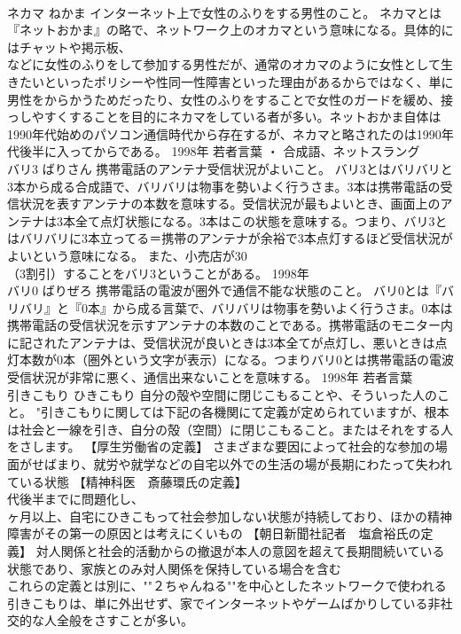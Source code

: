 \documentclass[8pt]{extreport}
\begin{document}
\begin{CJK}{UTF8}{min}
\\	ネカマ	ねかま	インターネット上で女性のふりをする男性のこと。	ネカマとは『ネットおかま』の略で、ネットワーク上のオカマという意味になる。具体的にはチャットや掲示板、
\\	などに女性のふりをして参加する男性だが、通常のオカマのように女性として生きたいといったポリシーや性同一性障害といった理由があるからではなく、単に男性をからかうためだったり、女性のふりをすることで女性のガードを緩め、接っしやすくすることを目的にネカマをしている者が多い。ネットおかま自体は1990年代始めのパソコン通信時代から存在するが、ネカマと略されたのは1990年代後半に入ってからである。	1998年	若者言葉 ・ 合成語、ネットスラング	
\\	バリ3	ばりさん	携帯電話のアンテナ受信状況がよいこと。	バリ3とはバリバリと3本から成る合成語で、バリバリは物事を勢いよく行うさま。3本は携帯電話の受信状況を表すアンテナの本数を意味する。受信状況が最もよいとき、画面上のアンテナは3本全て点灯状態になる。3本はこの状態を意味する。つまり、バリ3とはバリバリに3本立ってる＝携帯のアンテナが余裕で3本点灯するほど受信状況がよいという意味になる。 また、小売店が30
\\	（3割引）することをバリ3ということがある。	1998年	
\\	バリ0	ばりぜろ	携帯電話の電波が圏外で通信不能な状態のこと。	バリ0とは『バリバリ』と『0本』から成る言葉で、バリバリは物事を勢いよく行うさま。0本は携帯電話の受信状況を示すアンテナの本数のことである。携帯電話のモニター内に記されたアンテナは、受信状況が良いときは3本全てが点灯し、悪いときは点灯本数が0本（圏外という文字が表示）になる。つまりバリ0とは携帯電話の電波受信状況が非常に悪く、通信出来ないことを意味する。	1998年	若者言葉	
\\	引きこもり	ひきこもり	自分の殻や空間に閉じこもることや、そういった人のこと。	"引きこもりに関しては下記の各機関にて定義が定められていますが、根本は社会と一線を引き、自分の殻（空間）に閉じこもること。またはそれをする人をさします。 【厚生労働省の定義】 さまざまな要因によって社会的な参加の場面がせばまり、就労や就学などの自宅以外での生活の場が長期にわたって失われている状態 【精神科医　斎藤環氏の定義】 
\\	代後半までに問題化し、 
\\	ヶ月以上、自宅にひきこもって社会参加しない状態が持続しており、ほかの精神障害がその第一の原因とは考えにくいもの 【朝日新聞社記者　塩倉裕氏の定義】 対人関係と社会的活動からの撤退が本人の意図を超えて長期間続いている状態であり、家族とのみ対人関係を保持している場合を含む
\\	これらの定義とは別に、""２ちゃんねる""を中心としたネットワークで使われる引きこもりは、単に外出せず、家でインターネットやゲームばかりしている非社交的な人全般をさすことが多い。

\end{CJK}
\end{document}
